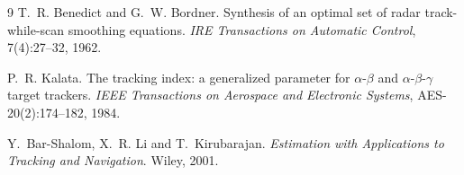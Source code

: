 \documentclass[11pt,a4paper]{article}
\theoremstyle{definition}
\theoremstyle{remark}
\begin{document}
\begin{thebibliography}{9}
T.~R. Benedict and G.~W. Bordner.
\newblock Synthesis of an optimal set of radar track-while-scan smoothing
  equations.
\newblock \emph{IRE Transactions on Automatic Control}, 7(4):27--32, 1962.

P.~R. Kalata.
\newblock The tracking index: a generalized parameter for $\alpha$-$\beta$ and
  $\alpha$-$\beta$-$\gamma$ target trackers.
\newblock \emph{IEEE Transactions on Aerospace and Electronic Systems},
  AES-20(2):174--182, 1984.

Y.~Bar-Shalom, X.~R. Li and T.~Kirubarajan.
\newblock \emph{Estimation with Applications to Tracking and Navigation}.
\newblock Wiley, 2001.
\end{thebibliography}
\end{document}

